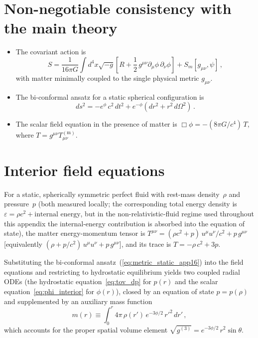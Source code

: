 \documentclass[11pt]{article}
\begin{document}
\section*{Non-negotiable consistency with the main theory}
\begin{itemize}
\item The covariant action is
\begin{equation}\label{eq:action_app16}
S=\frac{1}{16\pi G}\int d^4x\sqrt{-g}\left[R+\frac12\,
  g^{\mu\nu}\partial_\mu\phi\,\partial_\nu\phi\right]
  +S_m[g_{\mu\nu},\psi]\,,
\end{equation}
with matter minimally coupled to the single physical
metric $g_{\mu\nu}$.
\item The bi-conformal ansatz for a static spherical
configuration is
\begin{equation}\label{eq:metric_static_app16}
  ds^2 = -e^{\phi}\,c^2\,dt^2 + e^{-\phi}
  (dr^2 + r^2\,d\Omega^2)\,.
\end{equation}
\item The scalar field equation in the presence of matter is
$\Box\phi = -(8\pi G/c^4)\,T$, where
$T = g^{\mu\nu}T_{\mu\nu}^{(\mathrm{m})}$.
\end{itemize}

\section{Interior field equations}\label{sec:interior}

For a static, spherically symmetric perfect fluid with
rest-mass density~$\rho$ and pressure~$p$ (both measured
locally; the corresponding total energy density is
$\varepsilon=\rho c^2+\text{internal energy}$, but in the
non-relativistic-fluid regime used throughout this appendix
the internal-energy contribution is absorbed into the
equation of state), the matter energy-momentum tensor is
$T^{\mu\nu} = (\rho c^2 + p)\,u^\mu u^\nu/c^2 + p\,g^{\mu\nu}$
[equivalently $(\rho + p/c^2)\,u^\mu u^\nu + p\,g^{\mu\nu}$],
and its trace is $T = -\rho\,c^2 + 3p$.

Substituting the bi-conformal
ansatz~(\ref{eq:metric_static_app16}) into the field equations
and restricting to hydrostatic equilibrium yields two
coupled radial ODEs (the hydrostatic
equation~\ref{eq:tov_dp} for $p(r)$ and the scalar
equation~\ref{eq:phi_interior} for $\phi(r)$), closed by an
equation of state $p=p(\rho)$ and supplemented by an
auxiliary mass function
\begin{equation}\label{eq:mass_func}
  m(r) \equiv \int_0^r 4\pi\,\rho(r')\,e^{-3\phi/2}\,
  {r'}^2\,dr'\,,
\end{equation}
which accounts for the proper spatial volume element
$\sqrt{g^{(3)}} = e^{-3\phi/2}\,r^2\sin\theta$.
\end{document}
